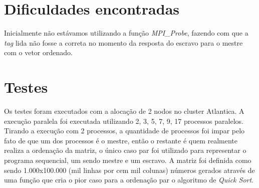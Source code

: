 \documentclass[12pt]{article}
\begin{document}
{\begin{multicols}{2}
\section{Dificuldades encontradas}
Inicialmente não estávamos utilizando a função \textit{MPI\_Probe}, fazendo com que a \textit{tag} lida não fosse a correta no momento da resposta do escravo para o mestre com o vetor ordenado.

\section{Testes}
Os testes foram executados com a alocação de 2 nodos no cluster Atlantica. A execução paralela foi executada utilizando 2, 3, 5, 7, 9, 17 processos paralelos. Tirando a execução com 2 processos, a quantidade de processos foi impar pelo fato de que um dos processos é o mestre, então o restante é quem realmente realiza a ordenação da matriz, o único caso par foi utilizado para representar o programa sequencial, um sendo mestre e um escravo. A matriz foi definida como sendo 1.000x100.000 (mil linhas por cem mil colunas) números gerados através de uma função que cria o pior caso para a ordenação par o algoritmo de \textit{Quick Sort}.


\end{multicols}}
\end{document}
